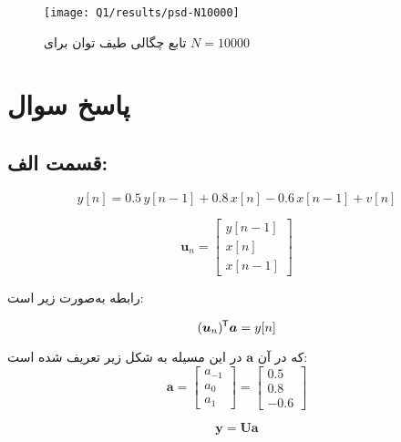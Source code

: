 \documentclass[12pt,onecolumn,a4paper]{article}
\newcommand*{\transpose}{{\mkern-1.5mu\mathsf{T}}}
\newcommand\question{
	\section{پاسخ سوال \tartibi{section}}
}
\begin{document}
	\begin{figure}[H]
		\centering
		\texttt{[image: Q1/results/psd-N10000]}
		\caption{تابع چگالی طیف توان برای \( N = 10000 \)}
		\label{fig:psd-n10000}
	\end{figure}
	
	
	
	
	
	
	\FloatBarrier
	\question%
	
	\FloatBarrier
	\subsection{قسمت الف:}
	
	
	
	\begin{equation}
		y[n] = 0.5 \, y[n-1] + 0.8 \, x[n] - 0.6 \, x[n-1] + v[n]
	\end{equation}
	
	
	\begin{equation}
		\bm{u}_n = \begin{bmatrix}
			y[n-1] \\
			x[n] \\
			x[n-1]
		\end{bmatrix}
	\end{equation}
	
	
	رابطه به‌صورت زیر است:
	
	\begin{equation}
		(\bm{u}_n)^\transpose \bm{a}
		= y[n]
	\end{equation}
	
	که در آن $\bm{a}$ در این مسیله به شکل زیر تعریف شده است:
	\begin{equation}
		\bm{a} = 
		\begin{bmatrix}
			a_{-1} \\
			a_{0} \\
			a_{1}
		\end{bmatrix} =
		\begin{bmatrix}
			0.5 \\
			0.8 \\
			-0.6
		\end{bmatrix}
	\end{equation}
	
	
	\begin{equation}
		\bm{y} = \bm{U} \bm{a}
	\end{equation}
	
\end{document}
